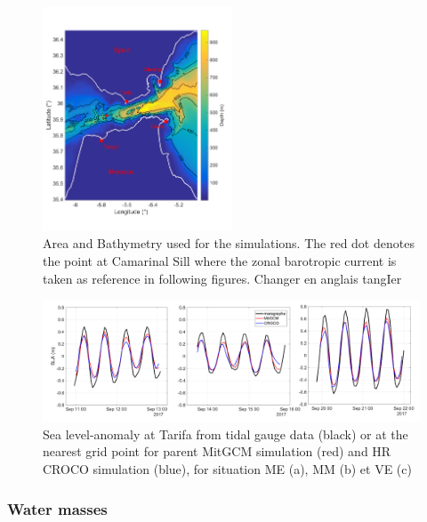 \begin{figure}[!h]
        \includegraphics[width=0.5\textwidth]{./GBR3D/FigBathyVHR.png}
        \caption{Area and Bathymetry used for the simulations. The red dot denotes the point at Camarinal Sill where the zonal barotropic current is taken as reference in following figures.  \color{blue}Changer en anglais tangIer \color{black}}
        \label{FigBathy3D}
\end{figure}



\begin{figure}[!h]
        \includegraphics[width=\textwidth]{./GBR3D/SLA_Tarifa_ME2VE2IES.png}
        \caption{Sea level-anomaly at Tarifa from tidal gauge data (black) or at the nearest grid point for parent MitGCM simulation (red) and HR CROCO simulation (blue), for situation ME (a), MM (b) et VE (c)}
        \label{fig_maree_tar}
\end{figure}

\subsubsection{Water masses}
\label{sectionWaterMasses}



